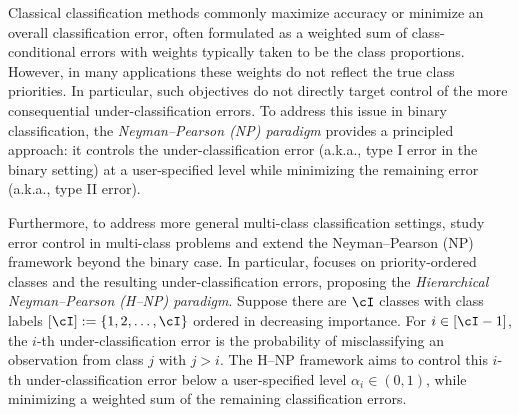 

Classical classification methods commonly maximize accuracy or minimize an overall classification error, often formulated as a weighted sum of class-conditional errors with weights typically taken to be the class proportions. However, in many applications these weights do not reflect the true class priorities. In particular, such objectives do not directly target control of the more consequential under-classification errors. To address this issue in binary classification, the \emph{Neyman--Pearson (NP) paradigm} \citep{cannon2002learning,scott2005comparison,tong2013plug} provides a principled approach: it controls the under-classification error (a.k.a., type I error in the binary setting) at a user-specified level while minimizing the remaining error (a.k.a., type II error). 


Furthermore, to address more general multi-class classification settings, \citep{wang2024hierarchical,tian2025neyman} study error control in multi-class problems and extend the Neyman--Pearson (NP) framework beyond the binary case. In particular, \citep{wang2024hierarchical} focuses on priority-ordered classes and the resulting under-classification errors, proposing the \emph{Hierarchical Neyman--Pearson (H--NP) paradigm}. Suppose there are $\cI$ classes with class labels $[\cI] :=\{1, 2,\ldots, \cI\}$ ordered in decreasing importance. For $i\in[\cI-1]$, the $i$-th under-classification error is the probability of misclassifying an observation from class $j$ with $j > i$. The H--NP framework aims to control this 
$i$-th under-classification error below a user-specified level $\alpha_i \in (0, 1)$, while minimizing a weighted sum of the remaining classification errors.

